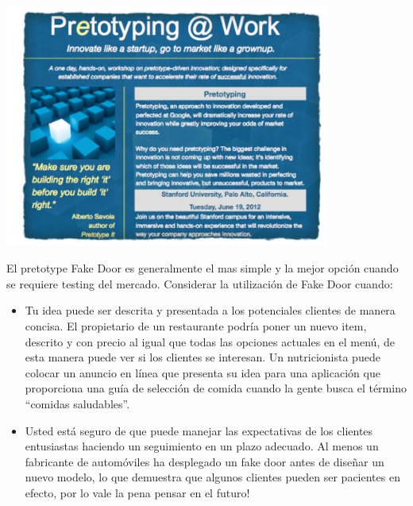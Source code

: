 \documentclass{article}
\begin{document}
\begin{enumerate}
\begin{center}
    \includegraphics[width=0.8\textwidth]{folleto}
\end{center}

El pretotype Fake Door es generalmente el mas simple y la mejor opci\'on cuando se requiere testing del mercado. Considerar la utilizaci\'on de Fake Door cuando:

\begin{itemize}

\item Tu idea puede ser descrita y presentada a los potenciales clientes de manera concisa. El propietario de un restaurante podr\'ia poner un nuevo item, descrito y con precio al igual que todas las opciones actuales en el men\'u, de esta manera puede ver si los clientes se interesan. Un nutricionista puede colocar un anuncio en l\'inea que presenta su idea para una aplicaci\'on que proporciona una gu\'ia de selecci\'on de comida cuando la gente busca el t\'ermino ``comidas saludables''.

\item Usted est\'a seguro de que puede manejar las expectativas de los clientes entusiastas haciendo un seguimiento en un plazo adecuado. Al menos un fabricante de autom\'oviles ha desplegado un fake door antes de dise\~nar un nuevo modelo, lo que demuestra que algunos clientes pueden ser pacientes en efecto, por lo vale la pena pensar en el futuro!

\end{itemize}


\end{enumerate}
\end{document}
